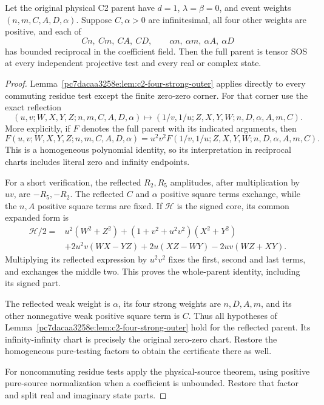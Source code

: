 \begin{theorem}
\label{p8b53b68d8af6:thm:c2-matching-strength}
Let the original physical C2 parent have $d=1$, $\lambda=\beta=0$,
and event weights $(n,m,C,A,D,\alpha)$.  Suppose $C,\alpha>0$ are
infinitesimal, all four other weights are positive, and each of
\[
 Cn,\ Cm,\ CA,\ CD,\qquad
 \alpha n,\ \alpha m,\ \alpha A,\ \alpha D
\]
has bounded reciprocal in the coefficient field.  Then the full parent
is tensor SOS at every independent projective test and every real or
complex state.
\end{theorem}
\begin{proof}
Lemma~\ref{pc7dacaa3258e:lem:c2-four-strong-outer} applies directly to every commuting
residue test except the finite zero-zero corner.
For that corner use the exact reflection
\begin{equation}
 (u,v;W,X,Y,Z;n,m,C,A,D,\alpha)
 \longmapsto
 (1/v,1/u;Z,X,Y,W;n,D,\alpha,A,m,C).
\label{p8b53b68d8af6:eq:c2ms-reflection}
\end{equation}
More explicitly, if $F$ denotes the full parent with its indicated
arguments, then
\begin{equation}
 F(u,v;W,X,Y,Z;n,m,C,A,D,\alpha)
 =u^2v^2F(1/v,1/u;Z,X,Y,W;n,D,\alpha,A,m,C).
\label{p8b53b68d8af6:eq:c2ms-reflection-identity}
\end{equation}
This is a homogeneous polynomial identity, so its interpretation in
reciprocal charts includes literal zero and infinity endpoints.

For a short verification, the reflected $R_2,R_5$ amplitudes, after
multiplication by $uv$, are $-R_5,-R_2$.  The reflected $C$ and
$\alpha$ positive square terms exchange, while the $n,A$ positive square terms are fixed.
If $\mathcal H$ is the signed core, its common expanded form is
\begin{align*}
 \mathcal H/2={}&u^2(W^2+Z^2)+(1+v^2+u^2v^2)(X^2+Y^2)\\
 &+2u^2v(WX-YZ)+2u(XZ-WY)-2uv(WZ+XY).
\end{align*}
Multiplying its reflected expression by $u^2v^2$ fixes the first,
second and last terms, and exchanges the middle two.  This proves the
whole-parent identity, including its signed part.

The reflected weak weight is $\alpha$, its four strong weights are
$n,D,A,m$, and its other nonnegative weak positive square term is $C$.
Thus all hypotheses of Lemma~\ref{pc7dacaa3258e:lem:c2-four-strong-outer} hold for
the reflected parent.  Its infinity-infinity chart is precisely the
original zero-zero chart.  Restore the homogeneous pure-testing
factors to obtain the certificate there as well.

For noncommuting residue tests apply the physical-source theorem, using
positive pure-source normalization when a coefficient is unbounded.
Restore that factor and split real and imaginary state parts.
\end{proof}

